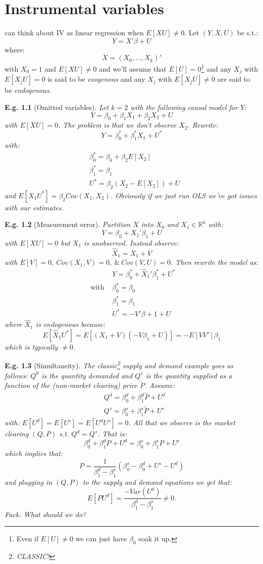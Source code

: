 \documentclass{tufte-book}
\theoremstyle{mytheoremstyle}
\theoremstyle{mylemstyle}
\theoremstyle{mydefstyle}
\newtheorem*{ex}{E.g.}
\begin{document}
\chapter{Instrumental variables}
 can think about IV as linear regression when \(E[XU] \ne 0\). Let \((Y, X, U)\) be s.t.:	
	\[Y = X' \beta + U\]
where:
	\[X = (X_0, \dots, X_k)'\]
with \(X_0 = 1\) and \(E[XU] \ne 0\) and we'll assume that \(E[U] = 0\)\footnote{Even if \(E[U] \ne 0\) we can just have \(\beta_0\) soak it up.} and any \(X_j \) with \(E[X_j U] = 0\) is said to be \emph{exogenous} and any \(X_j\) with \(E[X_j U] \ne 0\) are said to be \emph{endogenous}.
\begin{ex}[Omitted variables] Let \(k = 2\) with the following causal model for \(Y\):
	\[Y = \beta_0 + \beta_1 X_1 + \beta_2 X_2 + U\]
with \(E[XU] = 0\). The problem is that we don't observe \(X_2\). Rewrite:
	\[Y = \beta_0^* + \beta_1^* X_1 + U^*\]
with:
	\begin{align*}
		& \beta_0^* = \beta_0 + \beta_2 E[X_2] \\
		& \beta_1^* = \beta_1 \\
		& U^* = \beta_2(X_2 - E[X_2]) + U
	\end{align*}
and \(E[X_1 U^*] = \beta_2 Cov(X_1, X_2)\). Obviously if we just run OLS we've got issues with our estimates. 
\end{ex}
\begin{ex}[Measurement error] Partition \(X\) into \(X_0\) and \(X_1 \in \mathbb{R}^k\) with:
	\[Y = \beta_0 + X_1'\beta_1 + U\]
with \(E[XU] = 0\) but \(X_1\) is unobserved. Instead observe:
	\[\hat{X}_1 = X_1 + V\]
with \(E[V] = 0,\ Cov(X_1, V) = 0,\ \&\ Cov(V, U) = 0\). Then rewrite the model as:
	\begin{align*}
		& Y = \beta_0^* + \hat{X}_1' \beta_1^* + U^* \\
		\text{ with } & \beta_0^* = \beta_0 \\
				& \beta_1^* = \beta_1 \\
				& U^* = -V'\beta+1 + U
	\end{align*}
where \(\hat{X}_1\) is endogenous because:
	\[E[\hat{X}_1U^*] = E[(X_1 + V)(-V\beta_1 + U)] = -E[VV']\beta_1\]
which is typically \(\ne 0\).
\end{ex}
\begin{ex}[Simultaneity] The classic\footnote{CLASSIC!} supply and demand example goes as follows: \(Q^d\) is the quantity demanded and \(Q^s\) is the quantity supplied as a function of the (non-market clearing) price \(\tilde{P}\). Assume:
	\begin{align*}
		& Q^d = \beta_0^d + \beta_1^d\tilde{P} + U^d \\ 
		& Q^s = \beta_0^s + \beta_1^s \tilde{P} + U^s
	\end{align*}
with: \(E[U^d] = E[U^s] = E[U^d U^s] = 0\). All that we observe is the market clearing \((Q, P)\) s.t. \(Q^d = Q^s\). That is:
	\[\beta_0^d + \beta_1^dP + U^d = \beta_0^s + \beta_1^s P + U^s\]
which implies that:
	\[P = \frac{1}{\beta_1^d - \beta_1^s}(\beta_0^s - \beta_0^d + U^s - U^d)\]
and plugging in \((Q, P)\) to the supply and demand equations we get that:
	\[E[PU^d] = \frac{-Var(U^d)}{\beta_1^d - \beta_1^s} \ne 0 \text{.}\]
Fuck. What should we do?
\end{ex}
\end{document}
